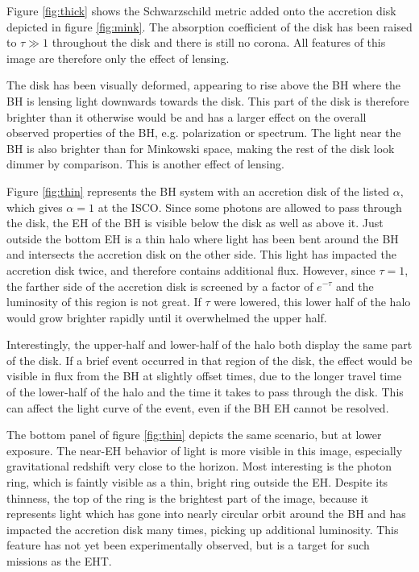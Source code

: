 \documentclass[twocolumn,twocolappendix]{aastex631}
\begin{document}
Figure \ref{fig:thick} shows the Schwarzschild metric added onto the accretion disk depicted in figure \ref{fig:mink}. The absorption coefficient of the disk has been raised to $\tau \gg 1$ throughout the disk and there is still no corona. All features of this image are therefore only the effect of lensing.

The disk has been visually deformed, appearing to rise above the BH where the BH is lensing light downwards towards the disk. This part of the disk is therefore brighter than it otherwise would be and has a larger effect on the overall observed properties of the BH, e.g. polarization or spectrum. The light near the BH is also brighter than for Minkowski space, making the rest of the disk look dimmer by comparison. This is another effect of lensing.

Figure \ref{fig:thin} represents the BH system with an accretion disk of the listed $\alpha$, which gives $\alpha = 1$ at the ISCO. Since some photons are allowed to pass through the disk, the EH of the BH is visible below the disk as well as above it. Just outside the bottom EH is a thin halo where light has been bent around the BH and intersects the accretion disk on the other side. This light has impacted the accretion disk twice, and therefore contains additional flux. However, since $\tau = 1$, the farther side of the accretion disk is screened by a factor of $e^{-\tau}$ and the luminosity of this region is not great. If $\tau$ were lowered, this lower half of the halo would grow brighter rapidly until it overwhelmed the upper half.

Interestingly, the upper-half and lower-half of the halo both display the same part of the disk. If a brief event occurred in that region of the disk, the effect would be visible in flux from the BH at slightly offset times, due to the longer travel time of the lower-half of the halo and the time it takes to pass through the disk. This can affect the light curve of the event, even if the BH EH cannot be resolved.

The bottom panel of figure \ref{fig:thin} depicts the same scenario, but at lower exposure. The near-EH behavior of light is more visible in this image, especially gravitational redshift very close to the horizon. Most interesting is the photon ring, which is faintly visible as a thin, bright ring outside the EH. Despite its thinness, the top of the ring is the brightest part of the image, because it represents light which has gone into nearly circular orbit around the BH and has impacted the accretion disk many times, picking up additional luminosity. This feature has not yet been experimentally observed, but is a target for such missions as the EHT.
\end{document}
